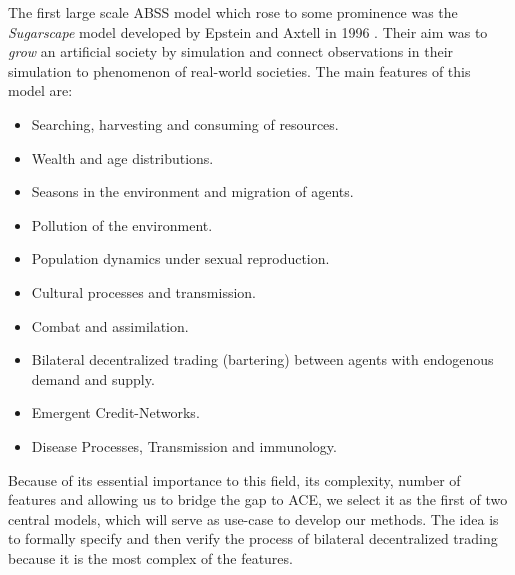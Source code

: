 
The first large scale ABSS model which rose to some prominence was the \textit{Sugarscape} model developed by Epstein and Axtell in 1996 \cite{epstein_growing_1996}. Their aim was to \textit{grow} an artificial society by simulation and connect observations in their simulation to phenomenon of real-world societies. The main features of this model are:

\begin{itemize}
	\item Searching, harvesting and consuming of resources.
	\item Wealth and age distributions.
	\item Seasons in the environment and migration of agents.
	\item Pollution of the environment.
	\item Population dynamics under sexual reproduction.
	\item Cultural processes and transmission.
	\item Combat and assimilation.
	\item Bilateral decentralized trading (bartering) between agents with endogenous demand and supply.
	\item Emergent Credit-Networks.
	\item Disease Processes, Transmission and immunology.
\end{itemize}

Because of its essential importance to this field, its complexity, number of features and allowing us to bridge the gap to ACE, we select it as the first of two central models, which will serve as use-case to develop our methods. The idea is to formally specify and then verify the process of bilateral decentralized trading because it is the most complex of the features.

